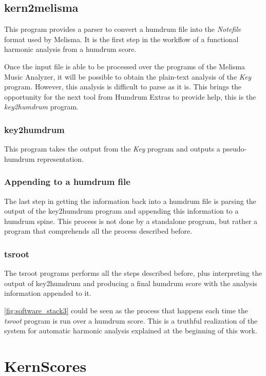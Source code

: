   \subsection{kern2melisma}
    This program provides a parser to convert a humdrum file into the \emph{Notefile} format used by Melisma. It is the first step in the workflow of a functional harmonic analysis from a humdrum score.

  Once the input file is able to be processed over the programs of the Melisma Music Analyzer, it will be possible to obtain the plain-text analysis of the \emph{Key} program. However, this analysis is difficult to parse as it is. This brings the opportunity for the next tool from Humdrum Extras to provide help, this is the \emph{key2humdrum} program.

  \subsubsection{key2humdrum}
    This program takes the output from the \emph{Key} program and outputs a pseudo-humdrum representation.

  \subsubsection{Appending to a humdrum file}
    The last step in getting the information back into a humdrum file is parsing the output of the key2humdrum program and appending this information to a humdrum spine. This process is not done by a standalone program, but rather a program that comprehends all the process described before.

  \subsubsection{tsroot}
    The tsroot programs performs all the steps described before, plus interpreting the output of key2humdrum and producing a final humdrum score with the analysis information appended to it.

    \autoref{fig:software_stack3} could be seen as the process that happens each time the \emph{tsroot} program is run over a humdrum score. This is a truthful realization of the system for automatic harmonic analysis explained at the beginning of this work.

\section{KernScores}
